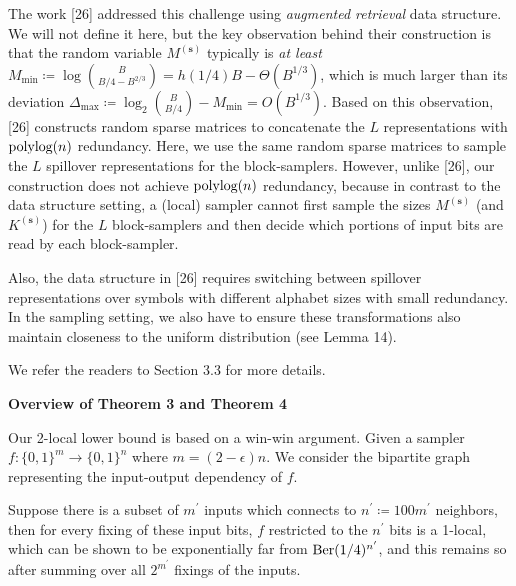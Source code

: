 The work [26] addressed this challenge using \emph{augmented retrieval} data structure.
We will not define it here, but the key observation behind their construction is that the random variable $M^{(\boldsymbol{s})}$ typically is \emph{at least} $M_{\min}\coloneq\log\binom{B}{B/4-B^{2/3}}=h(1/4)B-\Theta(B^{1/3})$, which is much larger than its deviation $\Delta_{\max}\coloneq\log_{2}\binom{B}{B/4}-M_{\min}=O(B^{1/3})$.
Based on this observation, [26] constructs random sparse matrices to concatenate the $L$ representations with $\textnormal{polylog}(n)$ redundancy. Here, we use the same random sparse matrices to sample the $L$ spillover representations for the block-samplers.
However, unlike [26], our construction does not achieve $\textnormal{polylog}(n)$ redundancy, because in contrast to the data structure setting, a (local) sampler cannot first sample the sizes $M^{(\boldsymbol{s})}$ (and $K^{(\boldsymbol{s})}$) for the $L$ block-samplers and then decide which portions of input bits are read by each block-sampler.\par




Also, the data structure in [26] requires switching between spillover representations over symbols with different alphabet sizes with small redundancy. In the sampling setting, we also have to ensure these transformations also maintain closeness to the uniform distribution (see Lemma 14).\par




We refer the readers to Section 3.3 for more details.\par






\par\medskip\noindent\textbf{Overview of Theorem 3 and Theorem 4
}\par




Our 2-local lower bound is based on a win-win argument.
Given a sampler $f\colon\{0,1\}^{m}\to\{0,1\}^{n}$ where $m=(2-\epsilon)n$.
We consider the bipartite graph representing the input-output dependency of $f$.\par




Suppose there is a subset of $m^{\prime}$ inputs which connects to $n^{\prime}\coloneq 100m^{\prime}$ neighbors, then for every fixing of these input bits, $f$ restricted to the $n^{\prime}$ bits is a 1-local, which can be shown to be exponentially far from $\textnormal{Ber}(1/4)^{n^{\prime}}$, and this remains so after summing over all $2^{m^{\prime}}$ fixings of the inputs.\par




